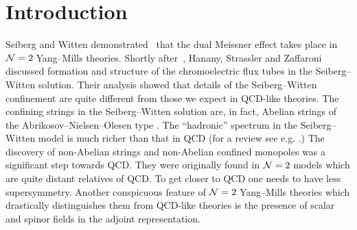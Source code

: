 \documentclass[epsfig,12pt]{article}
\newcommand{\ntwo}{${\cal N}=2\;$}
\begin{document}
\begin{titlepage}
\begin{abstract}
\end{abstract}

\end{titlepage}

\newpage

\section{Introduction}
\label{intro}
\setcounter{equation}{0}

Seiberg and Witten demonstrated~\cite{SW}  that the dual 
Meissner effect takes place in \ntwo Yang--Mills theories.
Shortly after~\cite{SW},  Hanany, Strassler and Zaffaroni discussed \cite{HSZ}
formation and structure of the chromoelectric flux tubes in the Seiberg--Witten
solution. Their analysis showed that details of
the Seiberg--Witten confinement are quite different from 
those we expect in QCD-like theories. The confining strings in the Seiberg--Witten
solution are, in fact, Abelian strings of the Abrikosov--Nielsen--Olesen
type \cite{ANO}. The ``hadronic'' spectrum  in the Seiberg--Witten
model is much richer than that in QCD (for a review see e.g. \cite{MattS}.)
The discovery of non-Abelian strings \cite{HT1,ABEKY}
and non-Abelian confined monopoles \cite{SYmon,HT2}
was a significant step towards QCD. They were originally found in
\ntwo models which are quite distant relatives of QCD. 
To get closer to QCD one needs to have less supersymmetry.
Another conspicuous feature of \ntwo Yang--Mills theories
which drastically distinguishes them from QCD-like theories
is the presence of scalar and spinor fields in the adjoint representation. 
\end{document}
